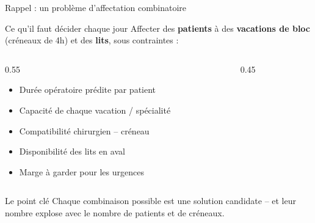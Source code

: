 \documentclass[aspectratio=169,11pt]{beamer}
\begin{document}
\begin{frame}{Rappel : un problème d'affectation combinatoire}
  \begin{block}{Ce qu'il faut décider chaque jour}
    Affecter des \textbf{patients} à des \textbf{vacations de bloc} (créneaux
    de 4h) et des \textbf{lits}, sous contraintes :
  \end{block}
  \begin{columns}
    \begin{column}{0.55\textwidth}
      \begin{itemize}
        \item Durée opératoire prédite par patient
        \item Capacité de chaque vacation / spécialité
        \item Compatibilité chirurgien -- créneau
        \item Disponibilité des lits en aval
        \item Marge à garder pour les urgences
      \end{itemize}
    \end{column}
    \begin{column}{0.45\textwidth}
      \centering
    \end{column}
  \end{columns}
  \begin{alertblock}{Le point clé}
    Chaque combinaison possible est une solution candidate -- et leur nombre
    explose avec le nombre de patients et de créneaux.
  \end{alertblock}
\end{frame}
\end{document}
